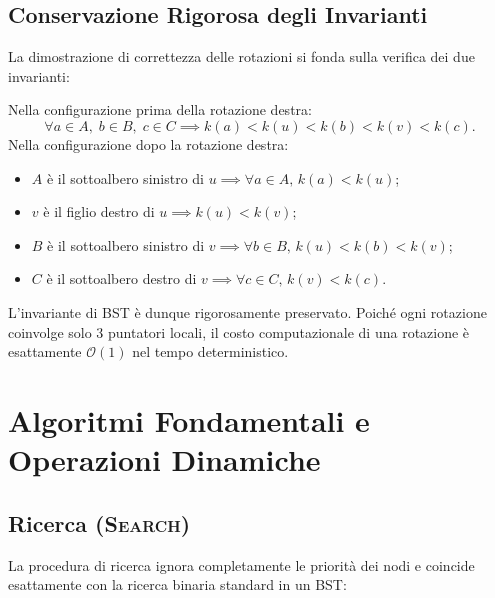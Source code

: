 \subsection{Conservazione Rigorosa degli Invarianti}
La dimostrazione di correttezza delle rotazioni si fonda sulla verifica dei due invarianti:
\begin{property}
Nella configurazione prima della rotazione destra:
\begin{equation}
  \forall a \in A, \; b \in B, \; c \in C \implies k(a) < k(u) < k(b) < k(v) < k(c).
\end{equation}
Nella configurazione dopo la rotazione destra:
\begin{itemize}
    \item $A$ \`e il sottoalbero sinistro di $u \implies \forall a \in A, \, k(a) < k(u)$;
    \item $v$ \`e il figlio destro di $u \implies k(u) < k(v)$;
    \item $B$ \`e il sottoalbero sinistro di $v \implies \forall b \in B, \, k(u) < k(b) < k(v)$;
    \item $C$ \`e il sottoalbero destro di $v \implies \forall c \in C, \, k(v) < k(c)$.
\end{itemize}
L'invariante di BST \`e dunque rigorosamente preservato. Poich\'e ogni rotazione coinvolge solo 3 puntatori locali, il costo computazionale di una rotazione \`e esattamente $\mathcal{O}(1)$ nel tempo deterministico.
\end{property}

\FloatBarrier
\section{Algoritmi Fondamentali e Operazioni Dinamiche}
\label{sec:treap-dynamic-algorithms}

\subsection{Ricerca (\textsc{Search})}
La procedura di ricerca ignora completamente le priorit\`a dei nodi e coincide esattamente con la ricerca binaria standard in un BST:

\begin{algorithm}[H]
\caption{Ricerca di una chiave nel Treap ($\textsc{Search}(u, k)$)}
\label{alg:treap-search}
\BlankLine
{}
\end{algorithm}

